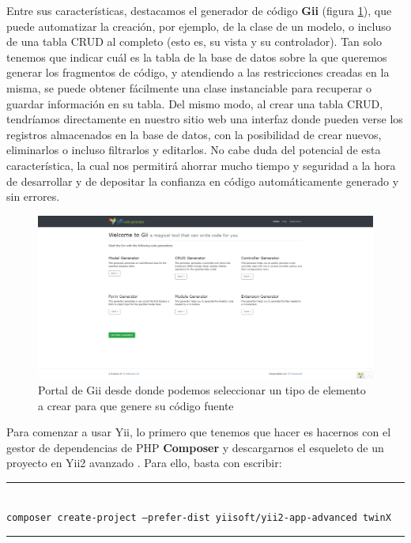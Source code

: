 Entre sus características, destacamos el generador de código \textbf{Gii} (figura \ref{fig:gii}), que puede automatizar la creación, por ejemplo, de la clase de un modelo, o incluso de una tabla CRUD al completo (esto es, su vista y su controlador). Tan solo tenemos que indicar cuál es la tabla de la base de datos sobre la que queremos generar los fragmentos de código, y atendiendo a las restricciones creadas en la misma, se puede obtener fácilmente una clase instanciable para recuperar o guardar información en su tabla. Del mismo modo, al crear una tabla CRUD, tendríamos directamente en nuestro sitio web una interfaz donde pueden verse los registros almacenados en la base de datos, con la posibilidad de crear nuevos, eliminarlos o incluso filtrarlos y editarlos. No cabe duda del potencial de esta característica, la cual nos permitirá ahorrar mucho tiempo y seguridad a la hora de desarrollar y de depositar la confianza en código automáticamente generado y sin errores.

\begin{figure}
	\centering
	\includegraphics[width=\textwidth]{gii}
	\caption[Portal de Gii]{Portal de Gii desde donde podemos seleccionar un tipo de elemento a crear para que genere su código fuente}
	\label{fig:gii}
\end{figure}


Para comenzar a usar Yii, lo primero que tenemos que hacer es hacernos con el gestor de dependencias de PHP \textbf{Composer} \cite{composer} y descargarnos el esqueleto de un proyecto en Yii2 avanzado \cite{yii2advanced}. Para ello, basta con escribir:

\par\noindent\rule{\textwidth}{0.4pt}\linebreak
\\
\texttt{composer create-project --prefer-dist yiisoft/yii2-app-advanced twinX}
\par\noindent\rule{\textwidth}{0.4pt}

